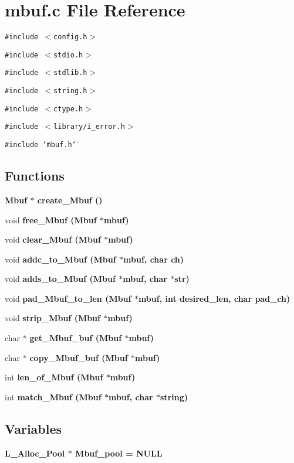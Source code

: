 \section{mbuf.c File Reference}
\label{mbuf_8c}
{\tt \#include $<$config.h$>$}\par
{\tt \#include $<$stdio.h$>$}\par
{\tt \#include $<$stdlib.h$>$}\par
{\tt \#include $<$string.h$>$}\par
{\tt \#include $<$ctype.h$>$}\par
{\tt \#include $<$library/i\_\-error.h$>$}\par
{\tt \#include \char`\"{}mbuf.h\char`\"{}}\par
\subsection*{Functions}
\begin{CompactItemize}
\item 
\bf{Mbuf} $\ast$ \bf{create\_\-Mbuf} ()
\item 
void \bf{free\_\-Mbuf} (\bf{Mbuf} $\ast$mbuf)
\item 
void \bf{clear\_\-Mbuf} (\bf{Mbuf} $\ast$mbuf)
\item 
void \bf{addc\_\-to\_\-Mbuf} (\bf{Mbuf} $\ast$mbuf, char ch)
\item 
void \bf{adds\_\-to\_\-Mbuf} (\bf{Mbuf} $\ast$mbuf, char $\ast$str)
\item 
void \bf{pad\_\-Mbuf\_\-to\_\-len} (\bf{Mbuf} $\ast$mbuf, int desired\_\-len, char pad\_\-ch)
\item 
void \bf{strip\_\-Mbuf} (\bf{Mbuf} $\ast$mbuf)
\item 
char $\ast$ \bf{get\_\-Mbuf\_\-buf} (\bf{Mbuf} $\ast$mbuf)
\item 
char $\ast$ \bf{copy\_\-Mbuf\_\-buf} (\bf{Mbuf} $\ast$mbuf)
\item 
int \bf{len\_\-of\_\-Mbuf} (\bf{Mbuf} $\ast$mbuf)
\item 
int \bf{match\_\-Mbuf} (\bf{Mbuf} $\ast$mbuf, char $\ast$string)
\end{CompactItemize}
\subsection*{Variables}
\begin{CompactItemize}
\item 
\bf{L\_\-Alloc\_\-Pool} $\ast$ \bf{Mbuf\_\-pool} = NULL
\end{CompactItemize}


